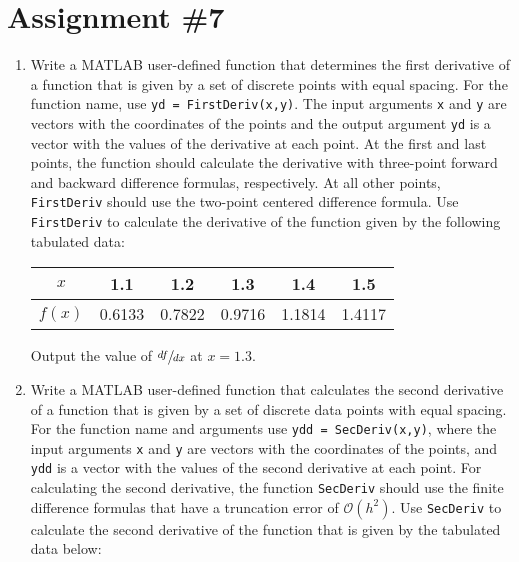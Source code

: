 \chapter{Assignment \#7}
\label{ch:ass7n}

\begin{fullwidth}
\begin{enumerate}
\item Write a MATLAB user-defined function that determines the first derivative of a function that is given by a set of discrete points with equal spacing.  For the function name, use \lstinline[style=myMatlab]{yd = FirstDeriv(x,y)}.  The input arguments \lstinline[style=myMatlab]{x} and \lstinline[style=myMatlab]{y} are vectors with the coordinates of the points and the output argument \lstinline[style=myMatlab]{yd} is a vector with the values of the derivative at each point.  At the first and last points, the function should calculate the derivative with three-point forward and backward difference formulas, respectively.  At all other points, \lstinline[style=myMatlab]{FirstDeriv} should use the two-point centered difference formula.  Use \lstinline[style=myMatlab]{FirstDeriv} to calculate the derivative of the function given by the following tabulated data:

\begin{table}[h!]
\centering
\begin{tabular}{|c|c|c|c|c|c|}
\hline
$x$ & 1.1 & 1.2 & 1.3 & 1.4 & 1.5 \\ \hline
$f(x)$ & 0.6133 & 0.7822 & 0.9716 & 1.1814 & 1.4117 \\ \hline
\end{tabular}
\end{table}
Output the value of $\sfrac{df}{dx}$ at $x=1.3$.

\vspace{3.0cm}

\item Write a MATLAB user-defined function that calculates the second derivative of a function that is given by a set of discrete data points with equal spacing.  For the function name and arguments use \lstinline[style=myMatlab]{ydd = SecDeriv(x,y)}, where the input arguments \lstinline[style=myMatlab]{x} and \lstinline[style=myMatlab]{y} are vectors with the coordinates of the points, and \lstinline[style=myMatlab]{ydd} is a vector with the values of the second derivative at each point.  For calculating the second derivative, the function \lstinline[style=myMatlab]{SecDeriv} should use the finite difference formulas that have a truncation error of $\mathcal{O}(h^2)$.  Use \lstinline[style=myMatlab]{SecDeriv} to calculate the second derivative of the function that is given by the tabulated data below:


\end{enumerate}
\end{fullwidth}
